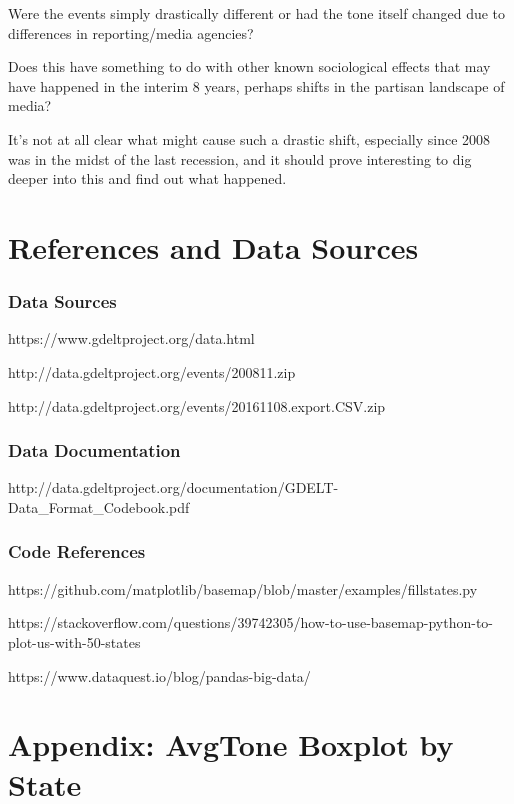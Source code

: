 \documentclass[11pt]{article}
\begin{document}
Were the events simply drastically different or had the tone itself
changed due to differences in reporting/media agencies?

Does this have something to do with other known sociological effects
that may have happened in the interim 8 years, perhaps shifts in the
partisan landscape of media?

It's not at all clear what might cause such a drastic shift, especially
since 2008 was in the midst of the last recession, and it should prove
interesting to dig deeper into this and find out what happened.

    \section{References and Data Sources}\label{references-and-data-sources}

    \subsubsection{Data Sources}\label{data-sources}

https://www.gdeltproject.org/data.html

http://data.gdeltproject.org/events/200811.zip

http://data.gdeltproject.org/events/20161108.export.CSV.zip

\subsubsection{Data Documentation}\label{data-documentation}

http://data.gdeltproject.org/documentation/GDELT-Data\_Format\_Codebook.pdf

\subsubsection{Code References}\label{code-references}

https://github.com/matplotlib/basemap/blob/master/examples/fillstates.py

https://stackoverflow.com/questions/39742305/how-to-use-basemap-python-to-plot-us-with-50-states

https://www.dataquest.io/blog/pandas-big-data/

    \section{Appendix: AvgTone Boxplot by
State}\label{appendix-avgtone-boxplot-by-state}
\end{document}
